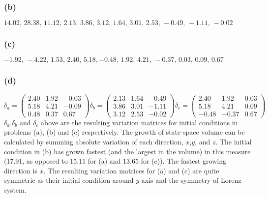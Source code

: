 \documentclass{article}
\begin{document}
\subsubsection*{(b)}
$14.02,\, 28.38, \, 11.12,\, 2.13,\, 3.86,\, 3.12,\, 1.64,\, 3.01,\, 2.53,\, -0.49,\, -1.11,\, -0.02$

\subsubsection*{(c)}
$-1.92,\, -4.22,\, 1.53,\, 2.40,\, 5.18, -0.48,\, 1.92,\, 4.21,\, -0.37,\, 0.03,\, 0.09,\, 0.67$
\subsubsection*{(d)}
\[
	\delta_{a} = \left( 
	\begin{array}{ccc}
		2.40 & 1.92 & -0.03 \\
		5.18 & 4.21 & -0.09 \\
		0.48 & 0.37 & 0.67 
	\end{array}
	 \right)
	\delta_{b} = \left( 
	\begin{array}{ccc}
		2.13 & 1.64 & -0.49 \\
		3.86 & 3.01 & -1.11 \\
		3.12 & 2.53 & -0.02 
	\end{array}
	 \right)
	 \delta_{c} = \left( 
	\begin{array}{ccc}
		2.40 & 1.92 & 0.03 \\
		5.18 & 4.21 & 0.09 \\
		-0.48 & -0.37 & 0.67 
	\end{array}
	 \right)
\]
$\delta_{a}$,$\delta_{b}$ and $\delta_{c}$ above are the resulting variation matrices for initial conditions in problems (a), (b) and (c) respectively.
The growth of state-space volume can be calculated by summing absolute variation of each direction, $x$,$y$, and $z$. The initial condition in (b) has grown fastest (and the largest in the volume) in this measure (17.91, as opposed to 15.11 for (a) and 13.65 for (c)). The fastest growing direction is $x$. The resulting variation matrices for (a) and (c) are quite symmetric as their initial condition around $y$-axis and the symmetry of Lorenz system. 
\end{document}
